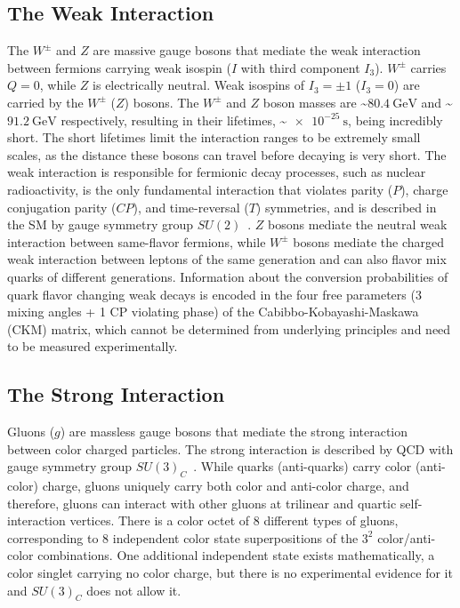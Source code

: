 \subsection{The Weak Interaction}
The $W^\pm$ and $Z$ are massive gauge bosons that mediate the weak interaction between fermions carrying weak isospin ($I$ with third component $I_3$).
$W^\pm$ carries $Q = 0$, while $Z$ is electrically neutral.
Weak isospins of $I_3 = \pm 1$ ($I_3 = 0$) are carried by the $W^\pm$ ($Z$) bosons.
The $W^\pm$ and $Z$ boson masses are \sim$\SI{80.4}{\GeV}$ and \sim$\SI{91.2}{\GeV}$ respectively, resulting in their lifetimes, \sim$\SI{e-25}{\s}$, being incredibly short.
The short lifetimes limit the interaction ranges to be extremely small scales, as the distance these bosons can travel before decaying is very short.
The weak interaction is responsible for fermionic decay processes, such as nuclear radioactivity, is the only fundamental interaction that violates parity ($P$), charge conjugation parity ($CP$), and time-reversal ($T$) symmetries, and is described in the SM by gauge symmetry group $SU(2)$~\cite{nagashima_2013_V1}.
$Z$ bosons mediate the neutral weak interaction between same-flavor fermions, while $W^\pm$ bosons mediate the charged weak interaction between leptons of the same generation and can also flavor mix quarks of different generations.
Information about the conversion probabilities of quark flavor changing weak decays is encoded in the four free parameters (3 mixing angles + 1 CP violating phase) of the Cabibbo-Kobayashi-Maskawa (CKM) matrix, which cannot be determined from underlying principles and need to be measured experimentally.

\subsection{The Strong Interaction}
Gluons ($g$) are massless gauge bosons that mediate the strong interaction between color charged particles.
The strong interaction is described by QCD with gauge symmetry group $SU(3)_C$~\cite{nagashima_2013_V1}.
While quarks (anti-quarks) carry color (anti-color) charge, gluons uniquely carry both color and anti-color charge, and therefore, gluons can interact with other gluons at trilinear and quartic self-interaction vertices.
There is a color octet of 8 different types of gluons, corresponding to 8 independent color state superpositions of the $3^2$ color/anti-color combinations.
One additional independent state exists mathematically, a color singlet carrying no color charge, but there is no experimental evidence for it and $SU(3)_C$ does not allow it.

